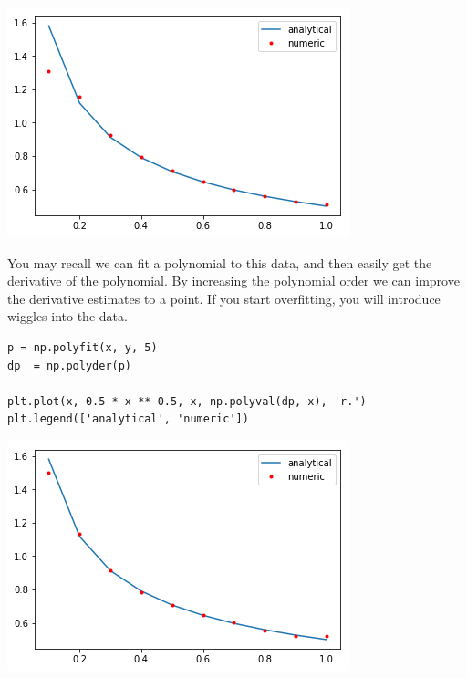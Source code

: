 \documentclass[11pt]{article}
\begin{document}
\begin{center}
\includegraphics[width=.9\linewidth]{obipy-resources/7b778712de6ec6a237e88377d645bb2e-78386DFy.png}
\end{center}

You may recall we can fit a polynomial to this data, and then easily get the derivative of the polynomial. By increasing the polynomial order we can improve the derivative estimates to a point. If you start overfitting, you will introduce wiggles into the data.

\begin{verbatim}
p = np.polyfit(x, y, 5)
dp  = np.polyder(p)

plt.plot(x, 0.5 * x **-0.5, x, np.polyval(dp, x), 'r.')
plt.legend(['analytical', 'numeric'])
\end{verbatim}

\begin{center}
\includegraphics[width=.9\linewidth]{obipy-resources/7b778712de6ec6a237e88377d645bb2e-78386DMm.png}
\end{center}
\end{document}
